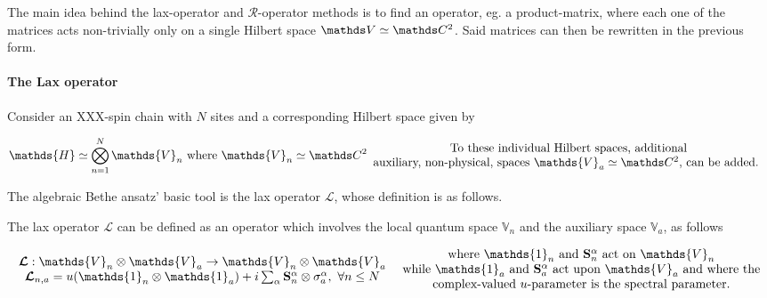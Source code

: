 \documentclass{homework}
\begin{document}
The main idea behind the lax-operator and $\bm{\mathcal{R}}$-operator methods is to find an operator, eg. a product-matrix, where each one of the matrices acts non-trivially only on a single Hilbert space $\vds \simeq \ctwo$. Said matrices can then be rewritten in the previous form. \\

\paragraph{\textbf{The Lax operator}} Consider an XXX-spin chain with $N$ sites and a corresponding Hilbert space given by 

\begin{align}
    \mathds{H} \simeq \bigotimes_{n=1}^{N} {\mathds{V}_n} \textnormal{ where } {\mathds{V}_n} \simeq \ctwo \begin{array}{c}
         \textnormal{To these individual Hilbert spaces, additional}  \\
         \textnormal{auxiliary, non-physical, spaces $\mathds{V}_a \simeq \ctwo$, can be added. } \\
    \end{array}
\end{align}

The algebraic Bethe ansatz' basic tool is the lax operator $\bm{\mathcal{L}}$, whose definition is as follows. 

\begin{df}
   The lax operator $\bm{\mathcal{L}}$ can be defined as an operator which involves the local quantum space $\mathds{V}_n$ and the auxiliary space $\mathds{V}_a$, as follows 

\begin{equation}
    \begin{array}{c}
         \bm{\mathcal{L}} : \mathds{V}_n \otimes \mathds{V}_a \rightarrow \mathds{V}_n \otimes \mathds{V}_a \\
         \bm{\mathcal{L}}_{n, a} = u(\mathds{1}_n \otimes \mathds{1}_a) + i \sum_{\alpha} \spin_n^\alpha \otimes \sigma_{a}^\alpha, \blanky \forall n \leq N \\
    \end{array} \begin{array}{c}
         \textnormal{ where $\mathds{1}_n$ and $\spin_n^\alpha$ act on $\mathds{V}_n $} \\
         \textnormal{ while $\mathds{1}_a$ and $\spin_a^\alpha$ act upon $\mathds{V}_a$ and where the}       \\
         \textnormal{ complex-valued $u$-parameter is the spectral parameter.}
    \end{array}
    \label{lax operator}
\end{equation}
\end{df}
\end{document}
